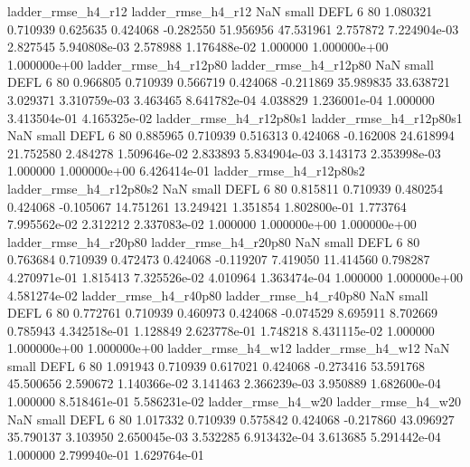       ladder_rmse_h4_r12       ladder_rmse_h4_r12                   NaN      small     DEFL                 6 80 1.080321       0.710939 0.625635       0.424068   -0.282550     51.956956     47.531961     2.757872   7.224904e-03  2.827545 5.940808e-03     2.578988   1.176488e-02            1.000000    1.000000e+00        1.000000e+00
   ladder_rmse_h4_r12p80    ladder_rmse_h4_r12p80                   NaN      small     DEFL                 6 80 0.966805       0.710939 0.566719       0.424068   -0.211869     35.989835     33.638721     3.029371   3.310759e-03  3.463465 8.641782e-04     4.038829   1.236001e-04            1.000000    3.413504e-01        4.165325e-02
 ladder_rmse_h4_r12p80s1  ladder_rmse_h4_r12p80s1                   NaN      small     DEFL                 6 80 0.885965       0.710939 0.516313       0.424068   -0.162008     24.618994     21.752580     2.484278   1.509646e-02  2.833893 5.834904e-03     3.143173   2.353998e-03            1.000000    1.000000e+00        6.426414e-01
 ladder_rmse_h4_r12p80s2  ladder_rmse_h4_r12p80s2                   NaN      small     DEFL                 6 80 0.815811       0.710939 0.480254       0.424068   -0.105067     14.751261     13.249421     1.351854   1.802800e-01  1.773764 7.995562e-02     2.312212   2.337083e-02            1.000000    1.000000e+00        1.000000e+00
   ladder_rmse_h4_r20p80    ladder_rmse_h4_r20p80                   NaN      small     DEFL                 6 80 0.763684       0.710939 0.472473       0.424068   -0.119207      7.419050     11.414560     0.798287   4.270971e-01  1.815413 7.325526e-02     4.010964   1.363474e-04            1.000000    1.000000e+00        4.581274e-02
   ladder_rmse_h4_r40p80    ladder_rmse_h4_r40p80                   NaN      small     DEFL                 6 80 0.772761       0.710939 0.460973       0.424068   -0.074529      8.695911      8.702669     0.785943   4.342518e-01  1.128849 2.623778e-01     1.748218   8.431115e-02            1.000000    1.000000e+00        1.000000e+00
      ladder_rmse_h4_w12       ladder_rmse_h4_w12                   NaN      small     DEFL                 6 80 1.091943       0.710939 0.617021       0.424068   -0.273416     53.591768     45.500656     2.590672   1.140366e-02  3.141463 2.366239e-03     3.950889   1.682600e-04            1.000000    8.518461e-01        5.586231e-02
      ladder_rmse_h4_w20       ladder_rmse_h4_w20                   NaN      small     DEFL                 6 80 1.017332       0.710939 0.575842       0.424068   -0.217860     43.096927     35.790137     3.103950   2.650045e-03  3.532285 6.913432e-04     3.613685   5.291442e-04            1.000000    2.799940e-01        1.629764e-01
